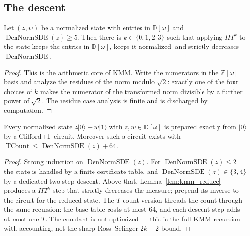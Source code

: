 \subsection{The descent}

\begin{lemma}
  \label{lem:kmm_reduce}
  \leanok
  Let $(z,w)$ be a normalized state with entries in $\mathbb{D}[\omega]$ and
  $\operatorname{DenNormSDE}(z) \ge 5$.  Then there is $k \in \{0,1,2,3\}$ such
  that applying $H T^{k}$ to the state keeps the entries in
  $\mathbb{D}[\omega]$, keeps it normalized, and strictly decreases
  $\operatorname{DenNormSDE}$.
\end{lemma}

\begin{proof}
  \leanok
  This is the arithmetic core of KMM.  Write the numerators in the
  $\mathbb{Z}[\omega]$ basis and analyze the residues of the norm modulo
  $\sqrt2$: exactly one of the four choices of $k$ makes the numerator of the
  transformed norm divisible by a further power of $\sqrt2$.  The residue case
  analysis is finite and is discharged by computation.
\end{proof}

\begin{lemma}
  \label{lem:kmm_state_prep}
  \leanok
  Every normalized state $z\lvert 0\rangle + w\lvert 1\rangle$ with
  $z, w \in \mathbb{D}[\omega]$ is prepared exactly from $\lvert 0\rangle$ by a
  Clifford+T circuit.  Moreover such a circuit exists with
  $\operatorname{TCount} \le \operatorname{DenNormSDE}(z) + 64$.
\end{lemma}

\begin{proof}
  \leanok
  Strong induction on $\operatorname{DenNormSDE}(z)$.  For
  $\operatorname{DenNormSDE}(z) \le 2$ the state is handled by a finite
  certificate table, and $\operatorname{DenNormSDE}(z) \in \{3,4\}$ by a
  dedicated two-step descent.  Above that, Lemma~\ref{lem:kmm_reduce} produces a
  $HT^k$ step that strictly decreases the measure; prepend its inverse to the
  circuit for the reduced state.  The $T$-count version threads the count
  through the same recursion: the base table costs at most $64$, and each
  descent step adds at most one $T$.  The constant is not optimized --- this is
  the full KMM recursion with accounting, not the sharp Ross--Selinger
  $2k-2$ bound.
\end{proof}

